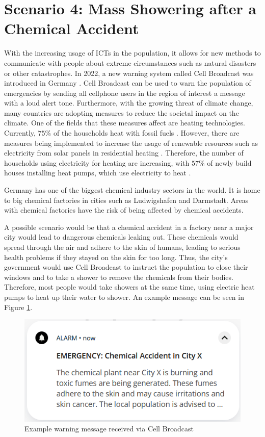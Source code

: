 \section{Scenario 4: Mass Showering after a Chemical Accident}
\label{scenario4total}

With the increasing usage of ICTs in the population, it allows for 
new methods to communicate with people about extreme circumstances
such as natural disasters or other catastrophes. In 2022,
a new warning system called Cell Broadcast was introduced in Germany
\cite{techrichtlinie}. Cell Broadcast can be used to warn the population
of emergencies by sending all cellphone users in the 
region of interest a message with a loud alert tone.
Furthermore, with the growing threat of climate change, many countries
are adopting measures to reduce the societal impact on the
climate. One of the fields that these measures affect 
are heating technologies. Currently, $75\%$ of the households 
heat with fossil fuels \cite{bdewhouhseholds}. 
However, there are measures being 
implemented to increase the usage of renewable resources such 
as electricity from solar panels in residential heating
\cite{heizungsgesetz}. Therefore, the number of households 
using electricity for heating are increasing, with 
$57\%$ of newly build houses installing 
heat pumps, which use electricity to heat
\cite{heatingpumps}.

Germany has one of the biggest chemical industry sectors in the world.
It is home to big chemical factories in cities such as Ludwigshafen and
Darmstadt. Areas with chemical factories have the risk of being
affected by chemical accidents.

A possible scenario would be that a chemical accident in a 
factory near a major city would lead to dangerous chemicals 
leaking out. These chemicals would spread through the air 
and adhere to the skin of humans, leading to serious 
health problems if they stayed on the skin for too long.
Thus, the city's government would use Cell Broadcast to
instruct the population to close their windows and 
to take a shower to remove the chemicals from their bodies.
Therefore, most people would take showers at the same time,
using electric heat pumps to heat up their water to shower.
An example message can be seen in Figure \ref{warningmessage}.

\begin{figure}[!ht]
    \center
    \includegraphics[scale=.7]{figs/emergencychemical.png}
    \caption{Example warning message received via Cell Broadcast}
    \label{warningmessage}
\end{figure}

